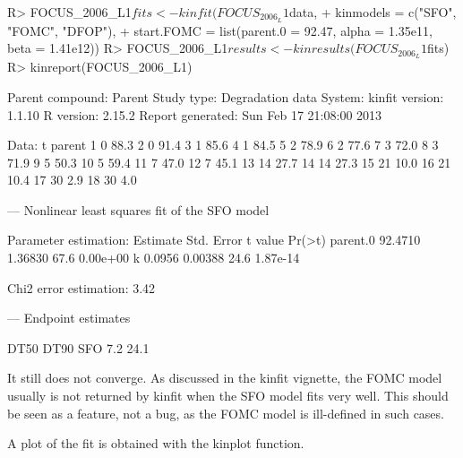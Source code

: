 \documentclass[12pt,a4paper]{article}
\begin{document}
\begin{Schunk}
\begin{Sinput}
R> FOCUS_2006_L1$fits <- kinfit(FOCUS_2006_L1$data, 
+   kinmodels = c("SFO", "FOMC", "DFOP"),
+   start.FOMC = list(parent.0 = 92.47, alpha = 1.35e11, beta = 1.41e12))
R> FOCUS_2006_L1$results <- kinresults(FOCUS_2006_L1$fits)
R> kinreport(FOCUS_2006_L1)
\end{Sinput}
\begin{Soutput}
Parent compound:  Parent 
Study type:       Degradation data 
System:            
kinfit version:   1.1.10 
R version:        2.15.2 
Report generated: Sun Feb 17 21:08:00 2013 

Data:
    t parent
1   0   88.3
2   0   91.4
3   1   85.6
4   1   84.5
5   2   78.9
6   2   77.6
7   3   72.0
8   3   71.9
9   5   50.3
10  5   59.4
11  7   47.0
12  7   45.1
13 14   27.7
14 14   27.3
15 21   10.0
16 21   10.4
17 30    2.9
18 30    4.0



---
Nonlinear least squares fit of the SFO model

Parameter estimation:	
         Estimate Std. Error t value   Pr(>t)
parent.0  92.4710    1.36830    67.6 0.00e+00
k          0.0956    0.00388    24.6 1.87e-14

Chi2 error estimation: 3.42 %



---
Endpoint estimates

    DT50 DT90
SFO  7.2 24.1
\end{Soutput}
\end{Schunk}

It still does not converge. As discussed in the kinfit vignette, the FOMC model usually
is not returned by kinfit when the SFO model fits very well. This should be seen as 
a feature, not a bug, as the FOMC model is ill-defined in such cases.

A plot of the fit is obtained with the kinplot function.
\end{document}
